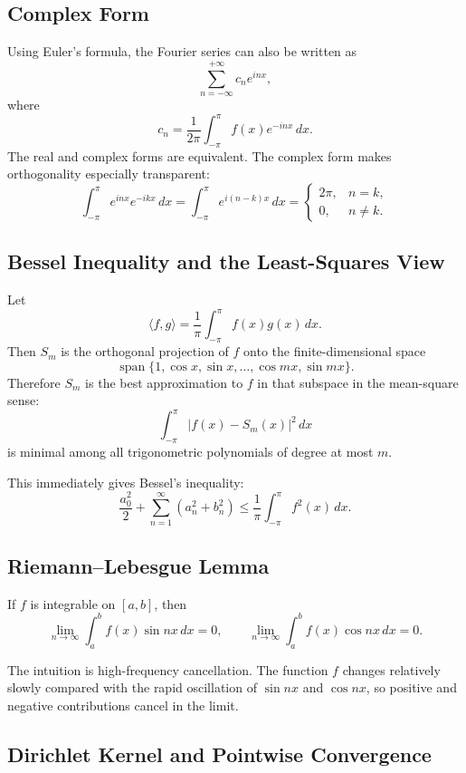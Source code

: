 \subsection{Complex Form}

Using Euler's formula, the Fourier series can also be written as
\[
    \sum_{n=-\infty}^{+\infty}c_n e^{inx},
\]
where
\[
    c_n=\frac1{2\pi}\int_{-\pi}^{\pi}f(x)e^{-inx}\,dx.
\]
The real and complex forms are equivalent. The complex form makes orthogonality especially transparent:
\[
    \int_{-\pi}^{\pi}e^{inx}e^{-ikx}\,dx
    =\int_{-\pi}^{\pi}e^{i(n-k)x}\,dx
    =
    \begin{cases}
    2\pi, & n=k,\\
    0, & n\ne k.
    \end{cases}
\]

\subsection{Bessel Inequality and the Least-Squares View}

Let
\[
    \langle f,g\rangle=\frac1\pi\int_{-\pi}^{\pi}f(x)g(x)\,dx.
\]
Then $S_m$ is the orthogonal projection of $f$ onto the finite-dimensional space
\[
    \operatorname{span}\{1,\cos x,\sin x,\ldots,\cos mx,\sin mx\}.
\]
Therefore $S_m$ is the best approximation to $f$ in that subspace in the mean-square sense:
\[
    \int_{-\pi}^{\pi}|f(x)-S_m(x)|^2\,dx
\]
is minimal among all trigonometric polynomials of degree at most $m$.

This immediately gives Bessel's inequality:
\[
    \frac{a_0^2}{2}+\sum_{n=1}^{\infty}(a_n^2+b_n^2)
    \le
    \frac1\pi\int_{-\pi}^{\pi}f^2(x)\,dx.
\]

\subsection{Riemann--Lebesgue Lemma}

If $f$ is integrable on $[a,b]$, then
\[
    \lim_{n\to\infty}\int_a^b f(x)\sin nx\,dx=0,
    \qquad
    \lim_{n\to\infty}\int_a^b f(x)\cos nx\,dx=0.
\]

The intuition is high-frequency cancellation. The function $f$ changes relatively slowly compared with the rapid oscillation of $\sin nx$ and $\cos nx$, so positive and negative contributions cancel in the limit.

\subsection{Dirichlet Kernel and Pointwise Convergence}

